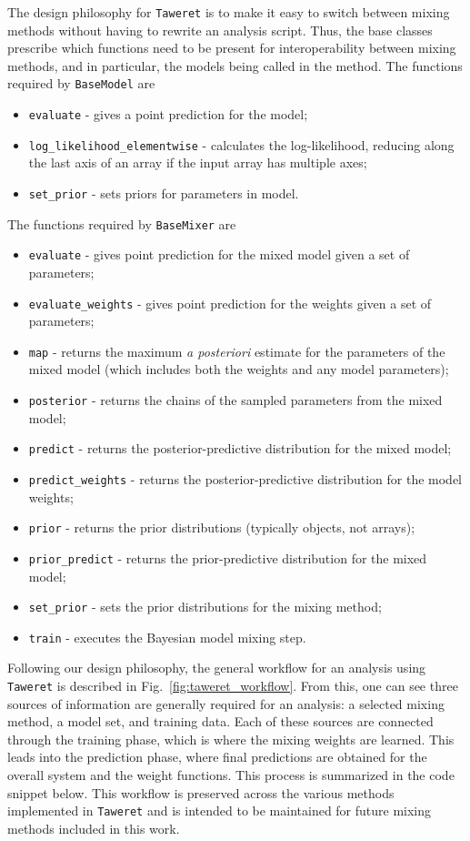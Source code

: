 \documentclass[10pt, preprint,aps,prc,floatfix,
tightenlines,
nofootinbib,superscriptaddress]{revtex4-2}
\begin{document}
The design philosophy for \texttt{Taweret} is to make it easy to switch between mixing methods without having to rewrite an analysis script.
Thus, the base classes prescribe which functions need to be present for interoperability between mixing methods, and in particular, the models being called in the method.
The functions required by \texttt{BaseModel} are 
\begin{itemize}[nosep]
    \item \texttt{evaluate} - gives a point prediction for the model;
    \item \texttt{log\_likelihood\_elementwise} - calculates the log-likelihood, reducing along the last axis of an array if the input array has multiple axes;
    \item \texttt{set\_prior} - sets priors for parameters in model.
\end{itemize}
The functions required by \texttt{BaseMixer} are
\begin{itemize}[nosep]
    \item \texttt{evaluate} - gives point prediction for the mixed model given a set of parameters;
    \item \texttt{evaluate\_weights} - gives point prediction for the weights given a set of parameters;
    \item \texttt{map} - returns the maximum \textit{a posteriori} estimate for the parameters of the mixed model (which includes both the weights and any model parameters);
    \item \texttt{posterior} - returns the chains of the sampled parameters from the mixed model;
    \item \texttt{predict} - returns the posterior-predictive distribution for the mixed model;
    \item \texttt{predict\_weights} - returns the posterior-predictive distribution for the model weights;
    \item \texttt{prior} - returns the prior distributions (typically objects, not arrays);
    \item \texttt{prior\_predict} - returns the prior-predictive distribution for the mixed model;
    \item \texttt{set\_prior} - sets the prior distributions for the mixing method;
    \item \texttt{train} - executes the Bayesian model mixing step.
\end{itemize}

Following our design philosophy, the general workflow for an analysis using \texttt{Taweret} is described in Fig.~\ref{fig:taweret_workflow}. From this, one can see three sources of information are generally required for an analysis: a selected mixing method, a model set, and training data. Each of these sources are connected through the training phase, which is where the mixing weights are learned. This leads into the prediction phase, where final predictions are obtained for the overall system and the weight functions. This process is summarized in the code snippet below. This workflow is preserved across the various methods implemented in \texttt{Taweret} and is intended to be maintained for future mixing methods included in this work.
\end{document}
